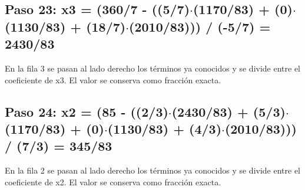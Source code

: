 \documentclass[conference]{IEEEtran}
\begin{document}

\medskip
\subsection*{Paso 23: x3 = (360/7 - ((5/7)\(\cdot\)(1170/83) + (0)\(\cdot\)(1130/83) + (18/7)\(\cdot\)(2010/83))) / (-5/7) = 2430/83}
En la fila 3 se pasan al lado derecho los términos ya conocidos y se divide entre el coeficiente de x3. El valor se conserva como fracción exacta.


\medskip
\subsection*{Paso 24: x2 = (85 - ((2/3)\(\cdot\)(2430/83) + (5/3)\(\cdot\)(1170/83) + (0)\(\cdot\)(1130/83) + (4/3)\(\cdot\)(2010/83))) / (7/3) = 345/83}
En la fila 2 se pasan al lado derecho los términos ya conocidos y se divide entre el coeficiente de x2. El valor se conserva como fracción exacta.

\end{document}
